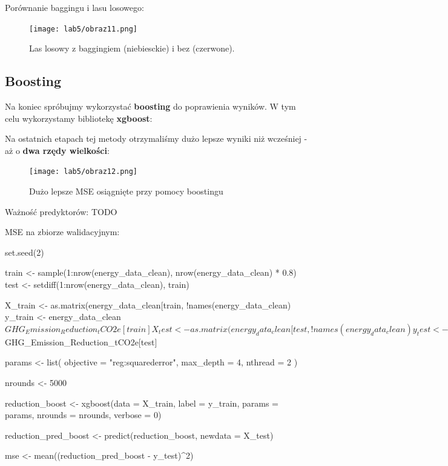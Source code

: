 Porównanie baggingu i lasu losowego:

\begin{figure}[H]
    \centering
    \texttt{[image: lab5/obraz11.png]}
    \caption{Las losowy z baggingiem (niebiesckie) i bez (czerwone).}
    \label{fig:enter-label}
\end{figure}

\subsection{Boosting}
Na koniec spróbujmy wykorzystać \textbf{boosting} do poprawienia wyników. W tym celu wykorzystamy bibliotekę \textbf{xgboost}:


Na ostatnich etapach tej metody otrzymaliśmy dużo lepsze wyniki niż wcześniej - aż o \textbf{dwa rzędy wielkości}:

\begin{figure}[H]
    \centering
    \texttt{[image: lab5/obraz12.png]}
    \caption{Dużo lepsze MSE osiągnięte przy pomocy boostingu}
    \label{fig:enter-label}
\end{figure}

Ważność predyktorów:
TODO

MSE na zbiorze walidacyjnym:
\begin{Rcode}
set.seed(2)

train <- sample(1:nrow(energy_data_clean), nrow(energy_data_clean) * 0.8)  
test <- setdiff(1:nrow(energy_data_clean), train)  

X_train <- as.matrix(energy_data_clean[train, !names(energy_data_clean) %
y_train <- energy_data_clean$GHG_Emission_Reduction_tCO2e[train]

X_test <- as.matrix(energy_data_clean[test, !names(energy_data_clean) %
y_test <- energy_data_clean$GHG_Emission_Reduction_tCO2e[test]

params <- list(
  objective = "reg:squarederror",  
  max_depth = 4,                   
  nthread = 2                     
)

nrounds <- 5000

reduction_boost <- xgboost(data = X_train, label = y_train, params = params, nrounds = nrounds, verbose = 0)

reduction_pred_boost <- predict(reduction_boost, newdata = X_test)

mse <- mean((reduction_pred_boost - y_test)^2)
\end{Rcode}


